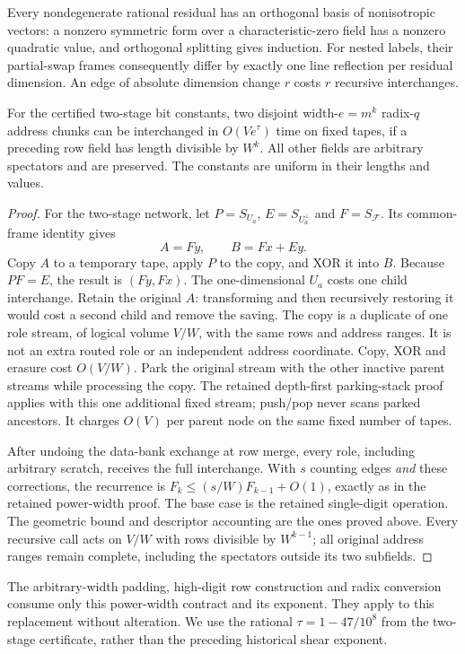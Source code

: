 Every nondegenerate rational residual has an orthogonal basis of
nonisotropic vectors: a nonzero symmetric form over a characteristic-zero
field has a nonzero quadratic value, and orthogonal splitting gives
induction. For nested labels, their partial-swap frames consequently differ
by exactly one line reflection per residual dimension. An edge of absolute
dimension change $r$ costs $r$ recursive interchanges.

\begin{proposition}
\label{prop:two-stage-power-interchange}
For the certified two-stage bit constants, two disjoint width-$e=m^k$
radix-$q$ address chunks can be interchanged in $O(Ve^\tau)$ time on fixed
tapes, if a preceding row field has length divisible by $W^k$. All other
fields are arbitrary spectators and are preserved. The constants are
uniform in their lengths and values.
\end{proposition}
\begin{proof}
For the two-stage network, let $P=S_{U_a}$, $E=S_{U_a^\perp}$ and
$F=S_{\mathcal F}$. Its common-frame identity gives
\[
 A=Fy,\qquad B=Fx+Ey.
\]
Copy $A$ to a temporary tape, apply $P$ to the copy, and XOR it into $B$.
Because $PF=E$, the result is $(Fy,Fx)$. The one-dimensional $U_a$ costs
one child interchange. Retain the original $A$: transforming and then
recursively restoring it would cost a second child and remove the saving.
The copy is a duplicate of one role stream, of logical volume $V/W$,
with the same rows and address ranges. It is not an extra routed role or
an independent address coordinate. Copy, XOR and erasure cost $O(V/W)$.
Park the original stream with the other inactive parent streams while
processing the copy. The retained depth-first parking-stack proof applies
with this one additional fixed stream; push/pop never scans parked ancestors.
It charges $O(V)$ per parent node on the same fixed number of tapes.

After undoing the data-bank exchange at row merge, every role, including
arbitrary scratch, receives the full interchange. With $s$ counting edges
\emph{and} these corrections, the recurrence is
$F_k\le(s/W)F_{k-1}+O(1)$, exactly as in the retained power-width proof.
The base case is the retained single-digit operation. The geometric bound
and descriptor accounting are the ones proved above. Every recursive call
acts on $V/W$ with rows divisible by $W^{k-1}$; all original address ranges
remain complete, including the spectators outside its two subfields.
\end{proof}
The arbitrary-width padding, high-digit row construction and radix conversion
consume only this power-width contract and its exponent. They apply to this
replacement without alteration. We use the rational
$\tau=1-47/10^8$ from the two-stage certificate, rather than the preceding
historical shear exponent.

